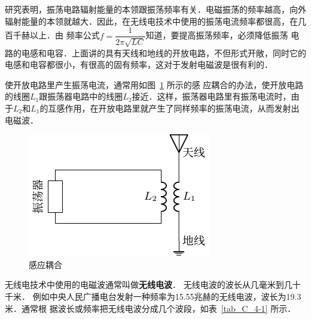 研究表明，振荡电路辐射能量的本领跟振荡频率有关．电磁振荡的频率越高，向外辐射能量的本领就越大．因此，在无线电技术中使用的振荡电流频率都很高，在几百千赫以上．由
频率公式$f=\dfrac{1}{2\pi\sqrt{LC}}$知道，要提高振荡频率，必须降低振荡
电路的电感和电容．上面讲的具有天线和地线的开放电路，不但形式开敞，同时它的电感和电容都很小，有很高的固有频率，这对于发射电磁波是很有利的．


使开放电路里产生振荡电流，通常用如图~\ref{fig_C_4-12} 所示的感
应耦合的办法，使开放电路的线圈$L_1$跟振荡器电路中的线圈$L_2$接近．这样，振荡器电路里有振荡电流时，由于$L_2$和$L_1$的互感作用，在开放电路里就产生了同样频率的振荡电流，从而发射出电磁波．
\begin{figure}[htbp]
	\centering
	\includegraphics{fig/C/4-12.pdf}
	\caption{感应耦合}\label{fig_C_4-12}
\end{figure}



无线电技术中使用的电磁波通常叫做\textbf{无线电波}．
无线电波的波长从几毫米到几十千米．
例如中央人民广播电台发射一种频率为15.55兆赫的无线电波，波长为19.3米．通常根
据波长或频率把无线电波分成几个波段，如表~\ref{tab_C_4-1} 所示．

